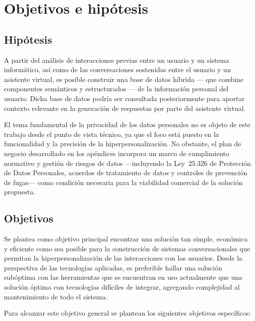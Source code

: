 \section{Objetivos e hipótesis}

\subsection{Hipótesis}

A partir del análisis de interacciones previas entre un usuario y un sistema informático, así como de las conversaciones sostenidas entre el usuario y un asistente virtual, es posible construir una base de datos híbrida — que combine componentes semánticos y estructurados — de la información personal del usuario. Dicha base de datos podría ser consultada posteriormente para aportar contexto relevante en la generación de respuestas por parte del asistente virtual.

El tema fundamental de la privacidad de los datos personales no es objeto de este trabajo desde el punto de vista técnico, ya que el foco está puesto en la funcionalidad y la precisión de la hiperpersonalización. No obstante, el plan de negocio desarrollado en los apéndices incorpora un marco de cumplimiento normativo y gestión de riesgos de datos —incluyendo la Ley~25.326 de Protección de Datos Personales, acuerdos de tratamiento de datos y controles de prevención de fugas— como condición necesaria para la viabilidad comercial de la solución propuesta.

\subsection{Objetivos}

Se plantea como objetivo principal encontrar una solución tan simple, económica y eficiente como sea posible para la construcción de sistemas conversacionales que permitan la hiperpersonalización de las interacciones con los usuarios. Desde la perspectiva de las tecnologías aplicadas, es preferible hallar una solución subóptima con las herramientas que se encuentran en uso actualmente que una solución óptima con tecnologías difíciles de integrar, agregando complejidad al mantenimiento de todo el sistema.

Para alcanzar este objetivo general se plantean los siguientes objetivos específicos:

